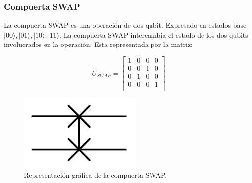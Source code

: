\subsubsection{Compuerta SWAP}
La compuerta SWAP es una operación de dos qubit. Expresado en estados base $|00\rangle, |01\rangle, |10\rangle, |11\rangle$. La compuerta SWAP intercambia el estado de los dos qubits involucrados en la operación. Esta representada por la matriz:\\
\begin{minipage}{0.5\linewidth}
\begin{equation*}
    U_{SWAP}=\left[\begin{matrix}
    1 & 0 & 0 & 0\\
    0 & 0 & 1 & 0\\
    0 & 1 & 0 & 0\\
    0 & 0 & 0 & 1\\
    \end{matrix}\right]
\end{equation*}
\end{minipage}
\begin{minipage}{0.5\linewidth}
\begin{figure}[H]
        \centering
        \includegraphics[scale=0.7]{images/swap_gate.png}
        \caption{Representación gráfica de la compuerta SWAP.}
    \end{figure}
\end{minipage}
